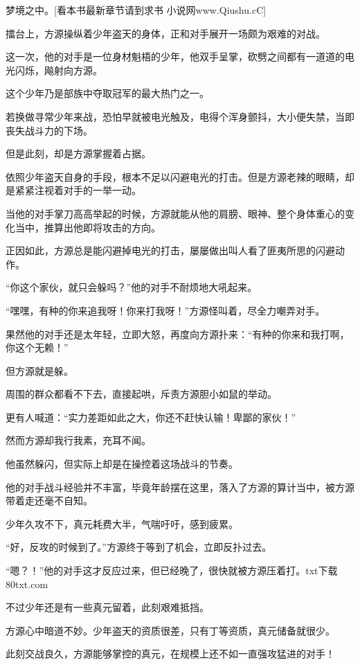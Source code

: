 
\begin{this_body}

梦境之中。[看本书最新章节请到求书 小说网www.Qiushu.cC]

擂台上，方源操纵着少年盗天的身体，正和对手展开一场颇为艰难的对战。

这一次，他的对手是一位身材魁梧的少年，他双手呈掌，砍劈之间都有一道道的电光闪烁，飚射向方源。

这个少年乃是部族中夺取冠军的最大热门之一。

若换做寻常少年来战，恐怕早就被电光触及，电得个浑身颤抖，大小便失禁，当即丧失战斗力的下场。

但是此刻，却是方源掌握着占据。

依照少年盗天自身的手段，根本不足以闪避电光的打击。但是方源老辣的眼睛，却是紧紧注视着对手的一举一动。

当他的对手掌刀高高举起的时候，方源就能从他的肩膀、眼神、整个身体重心的变化当中，推算出他即将攻击的方向。

正因如此，方源总是能闪避掉电光的打击，屡屡做出叫人看了匪夷所思的闪避动作。

“你这个家伙，就只会躲吗？”他的对手不耐烦地大吼起来。

“嘿嘿，有种的你来追我呀！你来打我呀！”方源怪叫着，尽全力嘲弄对手。

果然他的对手还是太年轻，立即大怒，再度向方源扑来：“有种的你来和我打啊，你这个无赖！”

但方源就是躲。

周围的群众都看不下去，直接起哄，斥责方源胆小如鼠的举动。

更有人喊道：“实力差距如此之大，你还不赶快认输！卑鄙的家伙！”

然而方源却我行我素，充耳不闻。

他虽然躲闪，但实际上却是在操控着这场战斗的节奏。

他的对手战斗经验并不丰富，毕竟年龄摆在这里，落入了方源的算计当中，被方源带着走还毫不自知。

少年久攻不下，真元耗费大半，气喘吁吁，感到疲累。

“好，反攻的时候到了。”方源终于等到了机会，立即反扑过去。

“嗯？！”他的对手这才反应过来，但已经晚了，很快就被方源压着打。txt下载80txt.com

不过少年还是有一些真元留着，此刻艰难抵挡。

方源心中暗道不妙。少年盗天的资质很差，只有丁等资质，真元储备就很少。

此刻交战良久，方源能够掌控的真元，在规模上还不如一直强攻猛进的对手！


\end{this_body}
